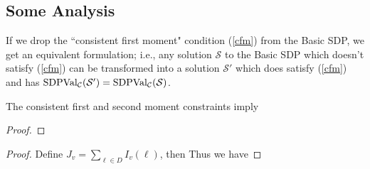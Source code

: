 \subsection{Some Analysis}
\begin{remark}\label{remark01}
If we drop the ``consistent first moment" condition (\ref{cfm}) from the Basic SDP, we get
an equivalent formulation; i.e., any solution $\mathcal{S}$ to the Basic SDP which doesn't satisfy  (\ref{cfm}) can be transformed into a solution $\mathcal{S}'$ which does satisfy  (\ref{cfm}) and has $\mbox{SDPVal}_{\mathcal{C}}(\mathcal{S}')
= \mbox{SDPVal}_{\mathcal{C}} (\mathcal{S})$.
\end{remark}

\begin{remark}
The consistent first and second moment constraints imply 
\end{remark}
\begin{proof}
\end{proof}
\begin{remark}
\end{remark}
\begin{proof}
Define $J_v = \sum_{\ell \in D} I_v(\ell)$, then 
Thus we have 
\end{proof}

